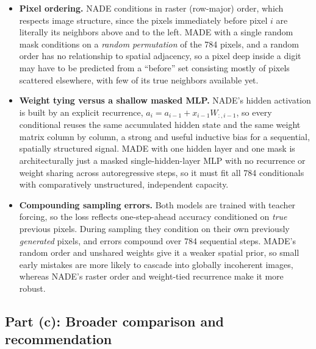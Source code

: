 \documentclass[11pt]{article}
\begin{document}
\begin{itemize}
  \item \textbf{Pixel ordering.} NADE conditions in raster (row-major) order,
  which respects image structure, since the pixels immediately before pixel $i$
  are literally its neighbors above and to the left. MADE with a single random
  mask conditions on a \emph{random permutation} of the 784 pixels, and a random
  order has no relationship to spatial adjacency, so a pixel deep inside a
  digit may have to be predicted from a ``before'' set consisting mostly of
  pixels scattered elsewhere, with few of its true neighbors available yet.
  \item \textbf{Weight tying versus a shallow masked MLP.} NADE's hidden
  activation is built by an explicit recurrence,
  $a_i = a_{i-1} + x_{i-1} W_{:,i-1}$, so every conditional reuses the same
  accumulated hidden state and the same weight matrix column by column, a
  strong and useful inductive bias for a sequential, spatially structured
  signal. MADE with one hidden layer and one mask is architecturally just a
  masked single-hidden-layer MLP with no recurrence or weight sharing across
  autoregressive steps, so it must fit all 784 conditionals with comparatively
  unstructured, independent capacity.
  \item \textbf{Compounding sampling errors.} Both models are trained with
  teacher forcing, so the loss reflects one-step-ahead accuracy conditioned on
  \emph{true} previous pixels. During sampling they condition on their own
  previously \emph{generated} pixels, and errors compound over 784 sequential
  steps. MADE's random order and unshared weights give it a weaker spatial
  prior, so small early mistakes are more likely to cascade into globally
  incoherent images, whereas NADE's raster order and weight-tied recurrence make
  it more robust.
\end{itemize}

\subsection*{Part (c): Broader comparison and recommendation}
\end{document}
